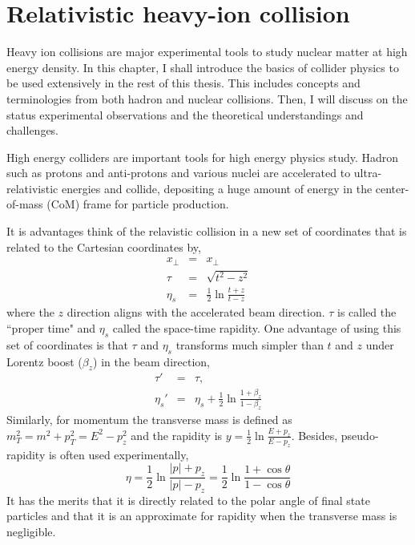 \section{Relativistic heavy-ion collision}
Heavy ion collisions are major experimental tools to study nuclear matter at high energy density.
In this chapter, I shall introduce the basics of collider physics to be used extensively in the rest of this thesis. 
This includes concepts and terminologies from both hadron and nuclear collisions. 
Then, I will discuss on the status experimental observations and the theoretical understandings and challenges.

High energy colliders are important tools for high energy physics study. 
Hadron such as protons and anti-protons and various nuclei are accelerated to ultra-relativistic energies and collide, depositing a huge amount of energy in the center-of-mass (CoM) frame for particle production.

It is advantages think of the relavistic collision in a new set of coordinates that is related to the Cartesian coordinates by,
\begin{eqnarray}
x_\perp &=& x_\perp\\
\tau &=& \sqrt{t^2 - z^2}\\
\eta_s &=& \frac{1}{2}\ln\frac{t+z}{t-z}
\end{eqnarray}
where the $z$ direction aligns with the accelerated beam direction.
$\tau$ is called the ``proper time" and $\eta_s$ called the space-time rapidity.
One advantage of using this set of coordinates is that $\tau$ and $\eta_s$ transforms much simpler than $t$ and $z$ under Lorentz boost ($\beta_z$) in the beam direction,
\begin{eqnarray}
\tau' &=& \tau,\\
\eta_s' &=& \eta_s + \frac{1}{2}\ln\frac{1+\beta_z}{1-\beta_z}
\end{eqnarray}
Similarly, for momentum the transverse mass is defined as $m_T^2 = m^2 + p_T^2 = E^2 - p_z^2$ and the rapidity is $y = \frac{1}{2}\ln\frac{E+p_z}{E-p_z}$.
Besides, pseudo-rapidity is often used experimentally,
\begin{equation}
    \eta = \frac{1}{2}\ln\frac{|p|+p_z}{|p|-p_z} = \frac{1}{2}\ln\frac{1+\cos\theta}{1-\cos\theta}
\end{equation}
It has the merits that it is directly related to the polar angle of final state particles and that it is an approximate for rapidity when the transverse mass is negligible.


